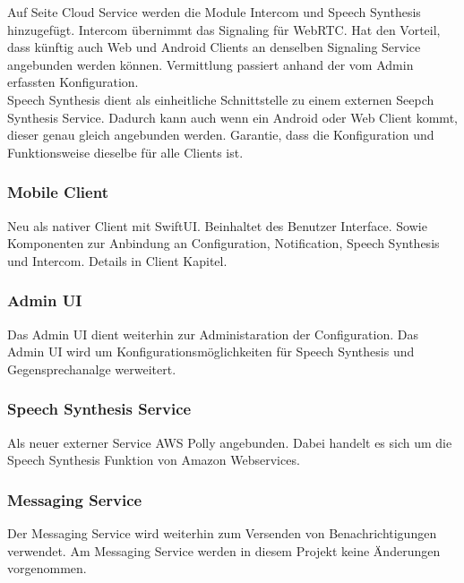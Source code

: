 Auf Seite Cloud Service werden die Module Intercom und Speech Synthesis hinzugefügt.
Intercom übernimmt das Signaling für WebRTC.
Hat den Vorteil, dass künftig auch Web und Android Clients an denselben Signaling Service angebunden werden können.
Vermittlung passiert anhand der vom Admin erfassten Konfiguration. \\

Speech Synthesis dient als einheitliche Schnittstelle zu einem externen Seepch Synthesis Service.
Dadurch kann auch wenn ein Android oder Web Client kommt, dieser genau gleich angebunden werden.
Garantie, dass die Konfiguration und Funktionsweise dieselbe für alle Clients ist. \\

\subsubsection*{Mobile Client}

Neu als nativer Client mit SwiftUI.
Beinhaltet des Benutzer Interface.
Sowie Komponenten zur Anbindung an Configuration, Notification, Speech Synthesis und Intercom.
Details in Client Kapitel. \\

\subsubsection*{Admin UI}
Das Admin UI dient weiterhin zur Administaration der Configuration.
Das Admin UI wird um Konfigurationsmöglichkeiten für Speech Synthesis und Gegensprechanalge werweitert. \\


\subsubsection*{Speech Synthesis Service}
Als neuer externer Service AWS Polly angebunden.
Dabei handelt es sich um die Speech Synthesis Funktion von Amazon Webservices. \\


\subsubsection*{Messaging Service}
Der Messaging Service wird weiterhin zum Versenden von Benachrichtigungen verwendet.
Am Messaging Service werden in diesem Projekt keine Änderungen vorgenommen. \\

\clearpage
